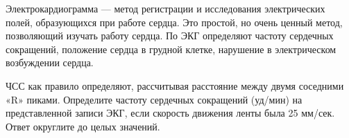 
Электрокардиограмма
— метод регистрации и исследования электрических полей, образующихся при работе
сердца. Это простой, но очень ценный метод, позволяющий изучать работу сердца.
По ЭКГ определяют частоту сердечных сокращений, положение сердца в грудной
клетке, нарушение в электрическом возбуждении сердца.


ЧСС как правило определяют,
рассчитывая расстояние между двумя соседними «R» пиками. Определите частоту
сердечных сокращений (уд/мин) на представленной записи ЭКГ, если скорость
движения ленты была 25 мм/сек. Ответ округлите до целых значений.

